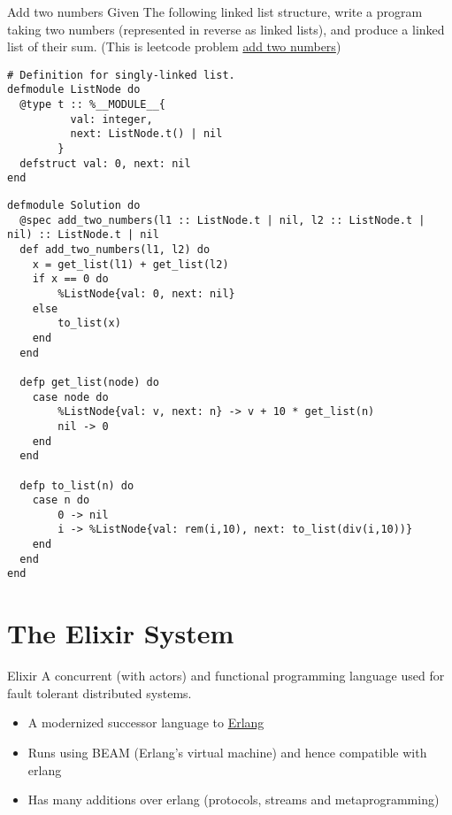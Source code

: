 \begin{examplebox}{Add two numbers}
  Given The following linked list structure, write a program taking two numbers (represented in reverse as linked lists), and produce a linked list of their sum.
  (This is leetcode problem \href{https://leetcode.com/problems/add-two-numbers/}{add two numbers})
  \begin{verbatim}
# Definition for singly-linked list.
defmodule ListNode do
  @type t :: %__MODULE__{
          val: integer,
          next: ListNode.t() | nil
        }
  defstruct val: 0, next: nil
end
  \end{verbatim}
  \tcblower
  \begin{verbatim}
defmodule Solution do
  @spec add_two_numbers(l1 :: ListNode.t | nil, l2 :: ListNode.t | nil) :: ListNode.t | nil
  def add_two_numbers(l1, l2) do
    x = get_list(l1) + get_list(l2)
    if x == 0 do
        %ListNode{val: 0, next: nil}
    else
        to_list(x)
    end
  end

  defp get_list(node) do
    case node do
        %ListNode{val: v, next: n} -> v + 10 * get_list(n)
        nil -> 0
    end
  end

  defp to_list(n) do
    case n do
        0 -> nil
        i -> %ListNode{val: rem(i,10), next: to_list(div(i,10))}
    end
  end
end
  \end{verbatim}
\end{examplebox}

\section{The Elixir System}
\begin{definitionbox}{Elixir}
  A concurrent (with actors) and functional programming language used for fault tolerant distributed systems.
  \begin{itemize}
    \item A modernized successor language to \href{https://www.erlang.org/}{Erlang}
    \item Runs using BEAM (Erlang's virtual machine) and hence compatible with erlang
    \item Has many additions over erlang (protocols, streams and metaprogramming)
  \end{itemize}
\end{definitionbox}

